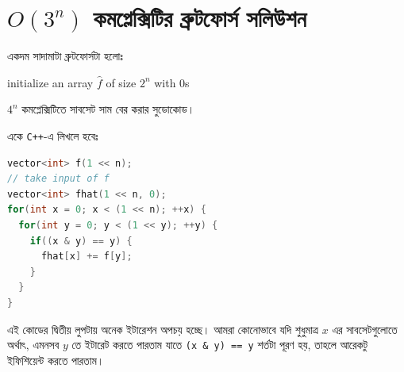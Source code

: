 \section{\texorpdfstring{$O(3^n)$}{O(pow(3,n))} কমপ্লেক্সিটির ব্রুটফোর্স
সলিউশন}
একদম সাদামাটা ব্রুটফোর্সটা হলোঃ

\begin{algorithm}[H]
  initialize an array $\hat{f}$ of size $2^n$ with 0s\;
   {
     {
    }
  }
  \caption{$4^n$ কমপ্লেক্সিটিতে সাবসেট সাম বের করার সুডোকোড।}
\end{algorithm}

একে \texttt{C++}-এ লিখলে হবেঃ
\begin{lstlisting}[language=C++]
vector<int> f(1 << n);
// take input of f
vector<int> fhat(1 << n, 0);
for(int x = 0; x < (1 << n); ++x) {
  for(int y = 0; y < (1 << y); ++y) {
    if((x & y) == y) {
      fhat[x] += f[y];
    }
  }
}
\end{lstlisting}
এই কোডের দ্বিতীয় লুপটায় অনেক ইটারেশন অপচয় হচ্ছে। আমরা কোনোভাবে যদি শুধুমাত্র
$x$ এর সাবসেটগুলোতে অর্থাৎ, এমনসব $y$ তে ইটারেট করতে পারতাম যাতে \texttt{(x
\& y) == y} শর্তটা পূরণ হয়, তাহলে আরেকটু ইফিশিয়েন্ট করতে পারতাম।

